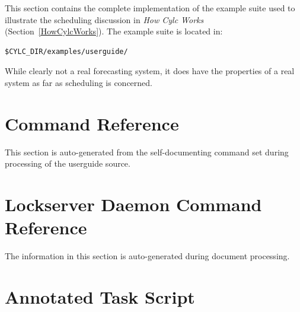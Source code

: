 \documentclass[11pt,a4paper]{article}
\begin{document}
This section contains the complete implementation of the example suite
used to illustrate the scheduling discussion in {\em How Cylc Works}
(Section~\ref{HowCylcWorks}). The example suite is located in:

\begin{lstlisting}
$CYLC_DIR/examples/userguide/
\end{lstlisting}

 While clearly not a real forecasting system, it does have the
 properties of a real system as far as scheduling is concerned.  

%


%

\pagebreak
\section{Command Reference}
\label{CommandReference}

This section is auto-generated from the self-documenting command set
during processing of the userguide source. 
  
\lstset{language=usage}

\pagebreak

\section{Lockserver Daemon Command Reference}
\label{LockserverDaemonCommandReference}

The information in this section is auto-generated during document processing.

\lstset{language=usage}

\pagebreak



\pagebreak
\section{Annotated Task Script}
\label{AnnotatedTaskScript}



\lstset{language=bash}



\pagebreak
\appendix
\end{document}
